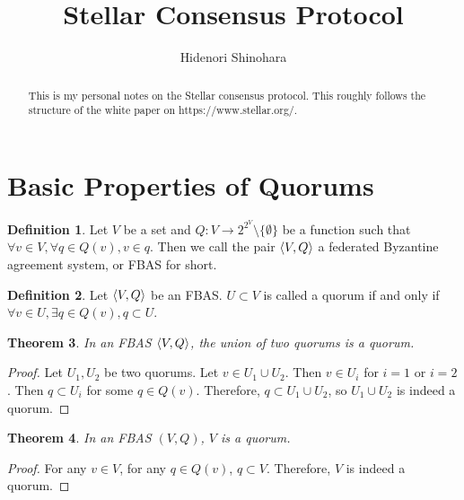 \documentclass[12pt, psamsfonts]{amsart}
\newtheorem{thm}{Theorem}[section]
\theoremstyle{definition}
\newtheorem{defn}[thm]{Definition}
\theoremstyle{remark}
\numberwithin{equation}{section}
\begin{document}
\title{Stellar Consensus Protocol}
\author{Hidenori Shinohara}
\maketitle

\begin{abstract}
    This is my personal notes on the Stellar consensus protocol.
    This roughly follows the structure of the white paper on https://www.stellar.org/.
\end{abstract}

\tableofcontents


\section{Basic Properties of Quorums}

\begin{defn}
    Let $V$ be a set and $Q:V \rightarrow 2^{2^V} \setminus \{ \emptyset \}$ be a function such that $\forall v \in V, \forall q \in Q(v), v \in q$.
    Then we call the pair $\ev{V, Q}$ a federated Byzantine agreement system, or FBAS for short.
\end{defn}

\begin{defn}
    Let $\ev{V, Q}$ be an FBAS.
    $U \subset V$ is called a quorum if and only if $\forall v \in U, \exists q \in Q(v), q \subset U$.
\end{defn}

\begin{thm}\label{union_quorums}
    In an FBAS $\ev{V, Q}$, the union of two quorums is a quorum.
\end{thm}

\begin{proof}
    Let $U_1, U_2$ be two quorums.
    Let $v \in U_1 \cup U_2$.
    Then $v \in U_i$ for $i = 1$ or $i = 2$.
    Then $q \subset U_i$ for some $q \in Q(v)$.
    Therefore, $q \subset U_1 \cup U_2$, so $U_1 \cup U_2$ is indeed a quorum.
\end{proof}

\begin{thm}
    In an FBAS $(V, Q)$, $V$ is a quorum.
\end{thm}

\begin{proof}
    For any $v \in V$, for any $q \in Q(v)$, $q \subset V$.
    Therefore, $V$ is indeed a quorum.
\end{proof}
\end{document}
